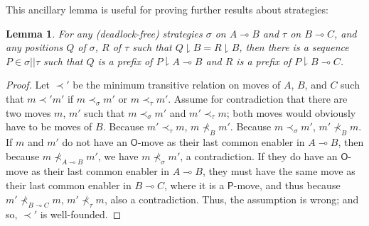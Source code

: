 \documentclass{article}
\newtheorem{lemma}[theorem]{Lemma}
\newcommand{\keep}{\downharpoonright}
\begin{document}
This ancillary lemma is useful for proving further results about strategies:
\begin{lemma}\label{lem:stratprefix}
  For any (deadlock-free) strategies $\sigma$ on $A\multimap B$ and $\tau$ on $B\multimap C$, and any positions $Q$ of $\sigma$, $R$ of $\tau$ such that $Q\keep B=R\keep B$,  then there is a sequence $P\in\sigma||\tau$ such that $Q$ is a prefix of $P\keep A\multimap B$ and $R$ is a prefix of $P\keep B\multimap C$.
\end{lemma}
\begin{proof}
  Let $\prec'$ be the minimum transitive relation on moves of $A$, $B$, and $C$ such that $m\prec'm'$ if $m\prec_\sigma m'$ or $m\prec_\tau m'$. Assume for contradiction that there are two moves $m$, $m'$ such that $m\prec_\sigma m'$ and $m'\prec_\tau m$; both moves would obviously have to be moves of $B$. Because $m'\prec_\tau m$, $m\nprec_B m'$. Because $m\prec_\sigma m'$, $m'\nprec_B m$. If $m$ and $m'$ do not have an $\mathsf{O}$-move as their last common enabler in $A\multimap B$, then because $m\nprec_{A\multimap B}m'$, we have $m\nprec_\sigma m'$, a contradiction. If they do have an $\mathsf{O}$-move as their last common enabler in $A\multimap B$, they must have the same move as their last common enabler in $B\multimap C$, where it is a $\mathsf{P}$-move, and thus because $m'\nprec_{B\multimap C}m$, $m'\nprec_\tau m$, also a contradiction. Thus, the assumption is wrong; and so, ${\prec'}$ is well-founded.


\end{proof}
\end{document}
